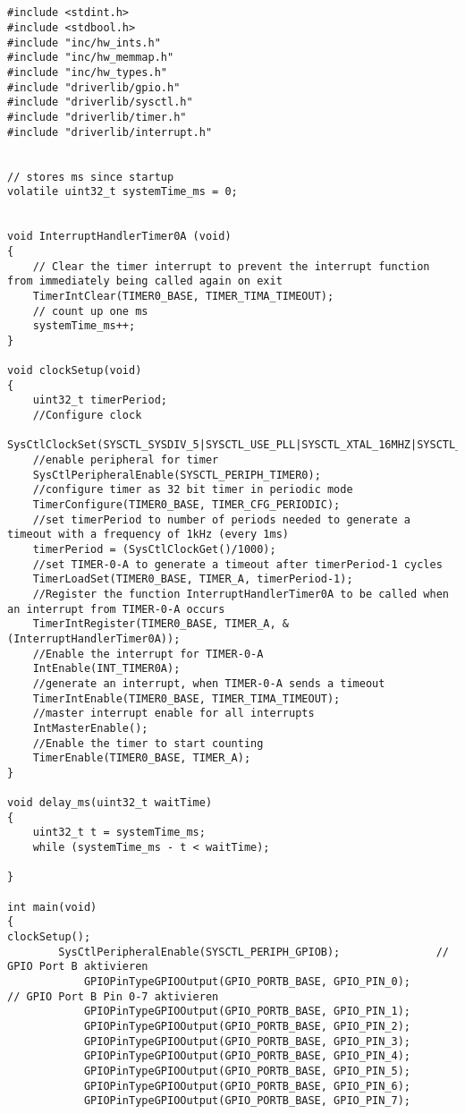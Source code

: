 \subsection{}
\begin{lstlisting}
#include <stdint.h>
#include <stdbool.h>
#include "inc/hw_ints.h"
#include "inc/hw_memmap.h"
#include "inc/hw_types.h"
#include "driverlib/gpio.h"
#include "driverlib/sysctl.h"
#include "driverlib/timer.h"
#include "driverlib/interrupt.h"


// stores ms since startup
volatile uint32_t systemTime_ms = 0;


void InterruptHandlerTimer0A (void)
{
    // Clear the timer interrupt to prevent the interrupt function from immediately being called again on exit
    TimerIntClear(TIMER0_BASE, TIMER_TIMA_TIMEOUT);
    // count up one ms
    systemTime_ms++;
}

void clockSetup(void)
{
    uint32_t timerPeriod;
    //Configure clock
    SysCtlClockSet(SYSCTL_SYSDIV_5|SYSCTL_USE_PLL|SYSCTL_XTAL_16MHZ|SYSCTL_OSC_MAIN);
    //enable peripheral for timer
    SysCtlPeripheralEnable(SYSCTL_PERIPH_TIMER0);
    //configure timer as 32 bit timer in periodic mode
    TimerConfigure(TIMER0_BASE, TIMER_CFG_PERIODIC);
    //set timerPeriod to number of periods needed to generate a timeout with a frequency of 1kHz (every 1ms)
    timerPeriod = (SysCtlClockGet()/1000);
    //set TIMER-0-A to generate a timeout after timerPeriod-1 cycles
    TimerLoadSet(TIMER0_BASE, TIMER_A, timerPeriod-1);
    //Register the function InterruptHandlerTimer0A to be called when an interrupt from TIMER-0-A occurs
    TimerIntRegister(TIMER0_BASE, TIMER_A, &(InterruptHandlerTimer0A));
    //Enable the interrupt for TIMER-0-A
    IntEnable(INT_TIMER0A);
    //generate an interrupt, when TIMER-0-A sends a timeout
    TimerIntEnable(TIMER0_BASE, TIMER_TIMA_TIMEOUT);
    //master interrupt enable for all interrupts
    IntMasterEnable();
    //Enable the timer to start counting
    TimerEnable(TIMER0_BASE, TIMER_A);
}

void delay_ms(uint32_t waitTime)
{
    uint32_t t = systemTime_ms;
    while (systemTime_ms - t < waitTime);

}

int main(void)
{
clockSetup();
        SysCtlPeripheralEnable(SYSCTL_PERIPH_GPIOB);               // GPIO Port B aktivieren
            GPIOPinTypeGPIOOutput(GPIO_PORTB_BASE, GPIO_PIN_0);         // GPIO Port B Pin 0-7 aktivieren
            GPIOPinTypeGPIOOutput(GPIO_PORTB_BASE, GPIO_PIN_1);
            GPIOPinTypeGPIOOutput(GPIO_PORTB_BASE, GPIO_PIN_2);
            GPIOPinTypeGPIOOutput(GPIO_PORTB_BASE, GPIO_PIN_3);
            GPIOPinTypeGPIOOutput(GPIO_PORTB_BASE, GPIO_PIN_4);
            GPIOPinTypeGPIOOutput(GPIO_PORTB_BASE, GPIO_PIN_5);
            GPIOPinTypeGPIOOutput(GPIO_PORTB_BASE, GPIO_PIN_6);
            GPIOPinTypeGPIOOutput(GPIO_PORTB_BASE, GPIO_PIN_7);


\end{lstlisting}
